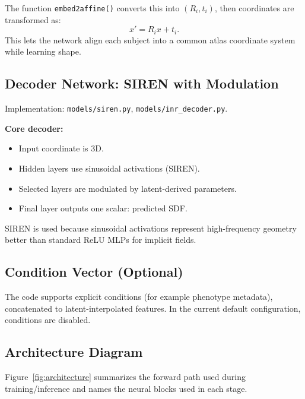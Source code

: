 ﻿\documentclass[11pt]{article}
\begin{document}
The function \texttt{embed2affine()} converts this into $(R_i, t_i)$, then coordinates are transformed as:
\begin{equation}
x' = R_i x + t_i.
\end{equation}
This lets the network align each subject into a common atlas coordinate system while learning shape.

\subsection{Decoder Network: SIREN with Modulation}
Implementation: \texttt{models/siren.py}, \texttt{models/inr\_decoder.py}.

\textbf{Core decoder:}
\begin{itemize}[leftmargin=*]
    \item Input coordinate is 3D.
    \item Hidden layers use sinusoidal activations (SIREN).
    \item Selected layers are modulated by latent-derived parameters.
    \item Final layer outputs one scalar: predicted SDF.
\end{itemize}

SIREN is used because sinusoidal activations represent high-frequency geometry better than standard ReLU MLPs for implicit fields.

\subsection{Condition Vector (Optional)}
The code supports explicit conditions (for example phenotype metadata), concatenated to latent-interpolated features. In the current default configuration, conditions are disabled.

\subsection{Architecture Diagram}
Figure~\ref{fig:architecture} summarizes the forward path used during training/inference and names the neural blocks used in each stage.
\end{document}

